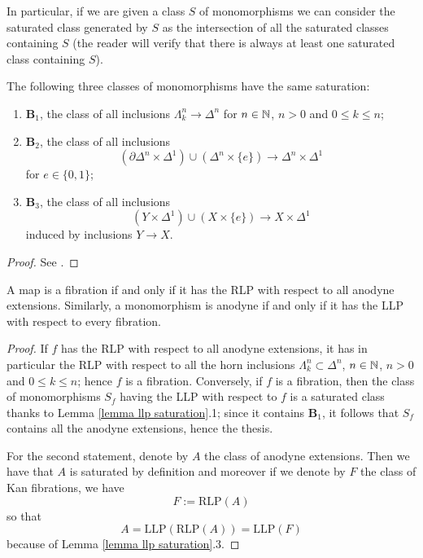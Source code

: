 \begin{refsection}
In particular, if we are given a class $S$ of monomorphisms we can consider the saturated class generated by $S$ as the intersection of all the saturated classes containing $S$ (the reader will verify that there is always at least one saturated class containing $S$).

\begin{thm} \label{thm anodyne}
The following three classes of monomorphisms have the same saturation:
\begin{enumerate}
\item $\mathbf B_1$, the class of all inclusions $\Lambda^n_k \to \Delta^n$ for $n \in \mathbb{N}$, $n > 0$ and $0 \le k \le n$;
\item $\mathbf B_2$, the class of all inclusions
\[
(\partial \Delta^n \times \Delta^1) \cup (\Delta^n \times \{e\}) \to \Delta^n \times \Delta^1
\]
for $e \in \{0,1\}$;
\item $\mathbf B_3$, the class of all inclusions
\[
(Y \times \Delta^1) \cup (X \times \{e\}) \to X \times \Delta^1
\]
induced by inclusions $Y \to X$.
\end{enumerate}
\end{thm}

\begin{proof}
See \cite[proposition I.4.2]{goerss-jardine-simplicial-homotopy-theory}.
\end{proof}

\begin{cor} \label{cor anodyne 1}
A map is a fibration if and only if it has the RLP with respect to all anodyne extensions. Similarly, a monomorphism is anodyne if and only if it has the LLP with respect to every fibration.
\end{cor}

\begin{proof}
If $f$ has the RLP with respect to all anodyne extensions, it has in particular the RLP with respect to all the horn inclusions $\Lambda^n_k \subset \Delta^n$, $n \in \mathbb{N}$, $n > 0$ and $0 \le k \le n$; hence $f$ is a fibration. Conversely, if $f$ is a fibration, then the class of monomorphisms $S_f$ having the LLP with respect to $f$ is a saturated class thanks to Lemma \ref{lemma llp saturation}.1; since it contains $\mathbf B_1$, it follows that $S_f$ contains all the anodyne extensions, hence the thesis.

For the second statement, denote by $A$ the class of anodyne extensions. Then we have that $A$ is saturated by definition and moreover if we denote by $F$ the class of Kan fibrations, we have
\[
F := \mathrm{RLP}(A)
\]
so that
\[
A = \mathrm{LLP}(\mathrm{RLP}(A)) = \mathrm{LLP}(F)
\]
because of Lemma \ref{lemma llp saturation}.3.
\end{proof}


\end{refsection}
